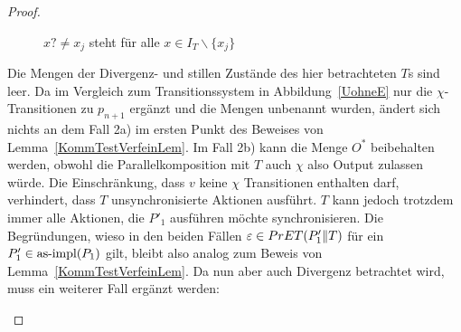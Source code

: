 \begin{proof}
\begin{itemize}
\begin{figure} [h!tbp]
\begin{center}
        \caption{$x?\neq x_j$ steht für alle $x\in I_T\backslash\{x_j\}$}
      \label{TohneEmitO}
      \end{center}
      \end{figure}
      Die Mengen der Divergenz- und stillen Zustände des hier betrachteten $T$s
      sind leer. Da im Vergleich zum Transitionssystem in
      Abbildung~\ref{UohneE} nur die $\chi$-Transitionen zu $p_{n+1}$ ergänzt
      und die Mengen unbenannt wurden, ändert sich nichts an dem Fall 2a) im
      ersten Punkt des Beweises von Lemma~\ref{KommTestVerfeinLem}. Im Fall 2b)
      kann die Menge $O^*$ beibehalten werden, obwohl die Parallelkomposition
      mit $T$ auch $\chi$ also Output zulassen würde. Die Einschränkung, dass
      $v$ keine $\chi$ Transitionen enthalten darf, verhindert, dass $T$
      unsynchronisierte Aktionen ausführt. $T$ kann jedoch trotzdem immer alle
      Aktionen, die $P'_1$ ausführen möchte synchronisieren. Die Begründungen,
      wieso in den beiden Fällen $\varepsilon \in PrET (P'_1\|T)$ für ein
      $P'_1\in\mathrm{as}\text{-}\mathrm{impl} (P_1)$ gilt, bleibt also analog zum Beweis von
      Lemma~\ref{KommTestVerfeinLem}. Da nun aber auch Divergenz betrachtet
      wird, muss ein weiterer Fall ergänzt werden:
\end{itemize}
\end{proof}

